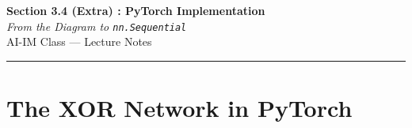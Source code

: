 \documentclass[12pt, a4paper]{article}
\begin{document}
\begin{center}
  {\LARGE \textbf{Section 3.4 (Extra) : PyTorch Implementation}} \\[0.3em]
  {\large\itshape From the Diagram to \texttt{nn.Sequential}} \\[0.5em]
  {\large AI-IM Class --- Lecture Notes}%
  \ifstudentmode
  \fi
\end{center}

\vspace{1em}
\hrule
\vspace{1.5em}

\section{The XOR Network in PyTorch}
\end{document}
